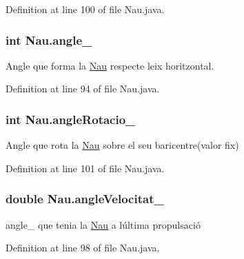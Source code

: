 Definition at line 100 of file Nau.\+java.

\hypertarget{class_nau_a7bdee12f00bd2087872ff3018144799e}{}
\subsubsection[{angle\+\_\+}]{\setlength{\rightskip}{0pt plus 5cm}int Nau.\+angle\+\_\+\hspace{0.3cm}{\ttfamily [protected]}}\label{class_nau_a7bdee12f00bd2087872ff3018144799e}


Angle que forma la \hyperlink{class_nau}{Nau} respecte l\textquotesingle{}eix horitzontal. 



Definition at line 94 of file Nau.\+java.

\hypertarget{class_nau_a4a3defe435bcea8864ff9025c740695a}{}
\subsubsection[{angle\+Rotacio\+\_\+}]{\setlength{\rightskip}{0pt plus 5cm}int Nau.\+angle\+Rotacio\+\_\+\hspace{0.3cm}{\ttfamily [private]}}\label{class_nau_a4a3defe435bcea8864ff9025c740695a}


Angle que rota la \hyperlink{class_nau}{Nau} sobre el seu baricentre(valor fix) 



Definition at line 101 of file Nau.\+java.

\hypertarget{class_nau_aa2ee3693a5f2a95449e0310f34d9fad4}{}
\subsubsection[{angle\+Velocitat\+\_\+}]{\setlength{\rightskip}{0pt plus 5cm}double Nau.\+angle\+Velocitat\+\_\+\hspace{0.3cm}{\ttfamily [protected]}}\label{class_nau_aa2ee3693a5f2a95449e0310f34d9fad4}


angle\+\_\+ que tenia la \hyperlink{class_nau}{Nau} a l\textquotesingle{}última propulsació 



Definition at line 98 of file Nau.\+java.

